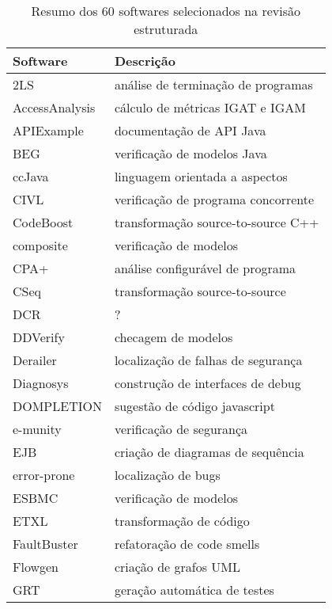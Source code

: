 \begin{table}[h]
{\scriptsize
\caption{Resumo dos 60 softwares selecionados na revisão estruturada}
\centering
\begin{tabular}{| l | l |}
  \hline
  Software       & Descrição                            \\
  \hline
  2LS            & análise de terminação de programas   \\
  AccessAnalysis & cálculo de métricas IGAT e IGAM      \\
  APIExample     & documentação de API Java             \\
  BEG            & verificação de modelos Java          \\
  ccJava         & linguagem orientada a aspectos       \\
  CIVL           & verificação de programa concorrente  \\
  CodeBoost      & transformação source-to-source C++   \\
  composite      & verificação de modelos               \\
  CPA+           & análise configurável de programa     \\
  CSeq           & transformação source-to-source       \\
  DCR            & ?                                    \\
  DDVerify       & checagem de modelos                  \\
  Derailer       & localização de falhas de segurança   \\
  Diagnosys      & construção de interfaces de debug    \\
  DOMPLETION     & sugestão de código javascript        \\
  e-munity       & verificação de segurança             \\
  EJB            & criação de diagramas de sequência    \\
  error-prone    & localização de bugs                  \\
  ESBMC          & verificação de modelos               \\
  ETXL           & transformação de código              \\
  FaultBuster    & refatoração de code smells           \\
  Flowgen        & criação de grafos UML                \\
  GRT            & geração automática de testes         \\

\end{tabular}}
\end{table}
